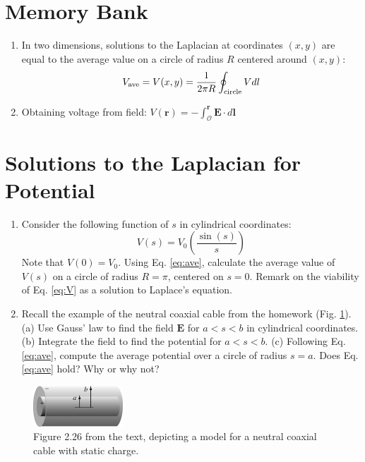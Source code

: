 \documentclass[12pt]{article}
\begin{document}
\maketitle

\section{Memory Bank}

\begin{enumerate}
\item In two dimensions, solutions to the Laplacian at coordinates $(x,y)$ are equal to the average value on a circle of radius $R$ centered around $(x,y)$:
\begin{equation}
V_{\rm ave} = V(x,y) = \frac{1}{2\pi R}\oint_{\rm circle} V dl \label{eq:ave}
\end{equation}
\item Obtaining voltage from field: $V(\mathbf{r}) = - \int_{\mathcal{O}}^{\mathbf{r}} \mathbf{E} \cdot d\mathbf{l}$
\end{enumerate}

\section{Solutions to the Laplacian for Potential}

\begin{enumerate}
\item Consider the following function of $s$ in cylindrical coordinates:
\begin{equation}
V(s) = V_0 \left(\frac{\sin(s)}{s}\right) \label{eq:V}
\end{equation}
Note that $V(0) = V_0$.  Using Eq. \ref{eq:ave}, calculate the average value of $V(s)$ on a circle of radius $R = \pi$, centered on $s = 0$.  Remark on the viability of Eq. \ref{eq:V} as a solution to Laplace's equation. \\ \vspace{2cm}
\item Recall the example of the neutral coaxial cable from the homework (Fig. \ref{fig:coax}). (a) Use Gauss' law to find the field $\mathbf{E}$ for $a < s < b$ in cylindrical coordinates. (b) Integrate the field to find the potential for $a < s < b$. (c) Following Eq. \ref{eq:ave}, compute the average potential over a circle of radius $s = a$.  Does Eq. \ref{eq:ave} hold?  Why or why not?
\end{enumerate}

\begin{figure}
\centering
\includegraphics[width=0.3\textwidth]{figures/2_26.jpg}
\caption{\label{fig:coax} Figure 2.26 from the text, depicting a model for a neutral coaxial cable with static charge.}
\end{figure}
\end{document}
